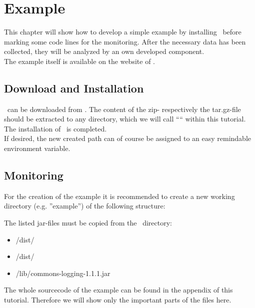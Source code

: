   \chapter{Example}
    This chapter will show how to develop a simple example by installing \Kieker\ before marking some code lines for the monitoring. After the necessary data has been collected, they will be analyzed by an own developed component.\\
    The example itself is available on the website of \Kieker.
    \section{Download and Installation}
      \Kieker\ can be downloaded from \KiekerDownloadUrl. The content of the zip- respectively the tar.gz-file should be extracted to any directory, which we will call ``\KiekerDir`` within this tutorial. The installation of \Kieker\ is completed.\\
      If desired, the new created path can of course be assigned to an easy remindable environment variable. 

    \section{Monitoring}
      For the creation of the example it is recommended to create a new working directory (e.g. ''example'') of the following structure:
      \begin{center}
      \end{center}
      The listed jar-files must be copied from the \Kieker\ directory:
      \begin{itemize}
	\item \KiekerDir/dist/\commonJar\
	\item \KiekerDir/dist/\monitoringCtrlJar\
	\item \KiekerDir/lib/commons-logging-1.1.1.jar
      \end{itemize}
      The whole sourcecode of the example can be found in the appendix of this tutorial. Therefore we will show only the important parts of the files here.

